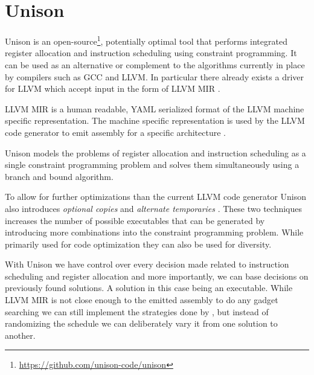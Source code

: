 \section{Unison}
\label{sec:unison}

Unison is an open-source\footnote{\url{https://github.com/unison-code/unison}},
potentially optimal tool that performs integrated register allocation and instruction
scheduling using constraint programming. It can be used as an alternative or complement to
the algorithms currently in place by compilers such as GCC and LLVM. In particular there
already exists a driver for LLVM which accept input in the form of LLVM MIR \cite{unison-docs}.

LLVM MIR is a human readable, YAML serialized format of the LLVM machine specific
representation\cite{llvm-mir-lang-ref}. The machine specific representation is used by the
LLVM code generator to emit assembly for a specific architecture \cite{welcome-to-backend}.

Unison models the problems of register allocation and instruction scheduling as a single
constraint programming problem and solves them simultaneously using a branch and bound
algorithm\cite{unison-docs,reg-alloc-inst-sched-uni,unison-src}.

To allow for further optimizations than the current LLVM code generator Unison also
introduces \textit{optional copies} and \textit{alternate temporaries}
\cite{reg-alloc-inst-sched}. These two techniques increases the number of possible executables
that can be generated by introducing more combinations into the constraint programming
problem. While primarily used for code optimization they can also be used for diversity.

With Unison we have control over every decision made related to instruction scheduling and
register allocation and more importantly, we can base decisions on previously found solutions.
A solution in this case being an executable. While LLVM MIR is not close enough to the
emitted assembly to do any gadget searching we can still implement the strategies done by
\textcite{large-scale-automated}, but instead of randomizing the schedule we can deliberately
vary it from one solution to another.
